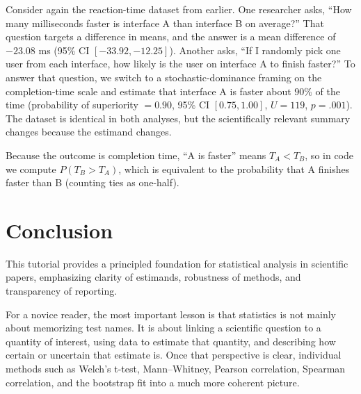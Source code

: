 \documentclass[11pt]{article}
\begin{document}
Consider again the reaction-time dataset from earlier. One researcher asks, ``How many milliseconds faster is interface A than interface B on average?'' That question targets a difference in means, and the answer is a mean difference of $-23.08$ ms (95\% CI $[-33.92, -12.25]$). Another asks, ``If I randomly pick one user from each interface, how likely is the user on interface A to finish faster?'' To answer that question, we switch to a stochastic-dominance framing on the completion-time scale and estimate that interface A is faster about $90\%$ of the time (probability of superiority $= 0.90$, 95\% CI $[0.75, 1.00]$, $U = 119$, $p = .001$). The dataset is identical in both analyses, but the scientifically relevant summary changes because the estimand changes.

Because the outcome is completion time, ``A is faster'' means \(T_A < T_B\), so in code we compute \(P(T_B > T_A)\), which is equivalent to the probability that A finishes faster than B (counting ties as one-half).



\section{Conclusion}

This tutorial provides a principled foundation for statistical analysis in scientific papers, emphasizing clarity of estimands, robustness of methods, and transparency of reporting.

For a novice reader, the most important lesson is that statistics is not mainly about memorizing test names. It is about linking a scientific question to a quantity of interest, using data to estimate that quantity, and describing how certain or uncertain that estimate is. Once that perspective is clear, individual methods such as Welch's t-test, Mann--Whitney, Pearson correlation, Spearman correlation, and the bootstrap fit into a much more coherent picture.



\end{document}
